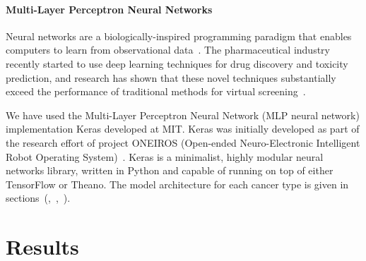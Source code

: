 \documentclass[10pt,letterpaper]{article}
\begin{document}


\paragraph{Multi-Layer Perceptron Neural Networks}
Neural networks are a biologically-inspired programming paradigm that enables computers to learn from observational data~\cite{deeplearning}.
The pharmaceutical industry recently started to use deep learning techniques for drug discovery and toxicity prediction, and research has shown that these novel techniques substantially exceed the performance of traditional methods for virtual screening~\cite{toxicity}.

We have used the Multi-Layer Perceptron Neural Network (MLP neural network) implementation Keras developed at MIT.
Keras was initially developed as part of the research effort of project ONEIROS (Open-ended Neuro-Electronic Intelligent Robot Operating System)~\cite{keras}.
Keras is a minimalist, highly modular neural networks library, written in Python and capable of running on top of either TensorFlow or Theano. The model architecture for each cancer type is given in sections~(,~,~).






\section{Results}
\label{sec:results}
\end{document}

